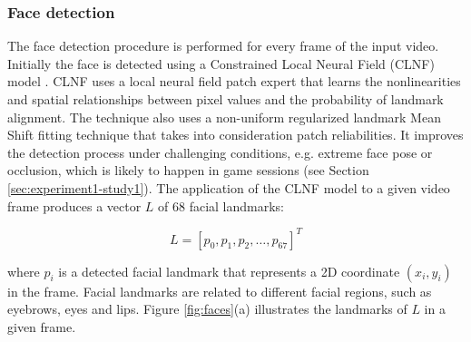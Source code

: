 \subsubsection{Face detection}

The face detection procedure is performed for every frame of the input video. Initially the face is detected using a Constrained Local Neural Field (CLNF) model \parencite{baltrusaitis2013constrained,baltruvsaitis2016openface}. CLNF uses a local neural field patch expert that learns the nonlinearities and spatial relationships between pixel values and the probability of landmark alignment. The technique also uses a non-uniform regularized landmark Mean Shift fitting technique that takes into consideration patch reliabilities. It improves the detection process under challenging conditions, e.g. extreme face pose or occlusion, which is likely to happen in game sessions (see Section \ref{sec:experiment1-study1}). The application of the CLNF model to a given video frame produces a vector $L$ of 68 facial landmarks:

\[
L = [p_0, p_1, p_2, \dots, p_{67}]^T
\]

where $p_i$ is a detected facial landmark that represents a 2D coordinate $(x_i, y_i)$ in the frame. Facial landmarks are related to different facial regions, such as eyebrows, eyes and lips. Figure \ref{fig:faces}(a) illustrates the landmarks of $L$ in a given frame.

